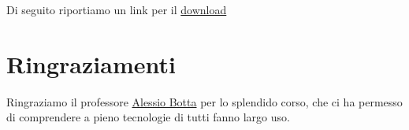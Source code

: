 \documentclass[letterpaper, 11pt]{article}
\begin{document}
Di seguito riportiamo un link per il \href{https://github.com/luftmensch-luftmensch/StealBot}{download} \autocite{informazioniRepository}
\section{Ringraziamenti}
\label{sec:orgde0e1f8}
Ringraziamo il professore \href{mailto:a.botta@unina.it}{Alessio Botta} per lo splendido corso, che ci ha permesso di comprendere a pieno tecnologie di tutti fanno largo uso.
\end{document}
